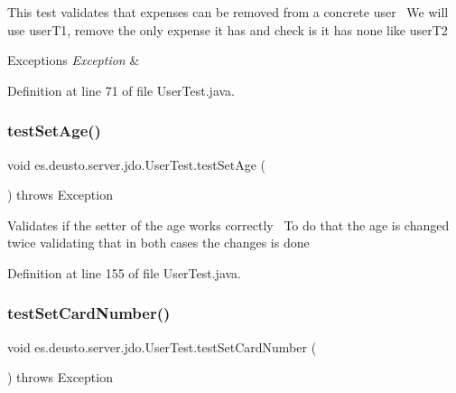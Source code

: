 This test validates that expenses can be removed from a concrete user~\newline
We will use user\+T1, remove the only expense it has and check is it has none like user\+T2 
\begin{DoxyExceptions}{Exceptions}
{\em Exception} & \\
\hline
\end{DoxyExceptions}


Definition at line 71 of file User\+Test.\+java.

\mbox{\label{classes_1_1deusto_1_1server_1_1jdo_1_1_user_test_ac45f9cf087026405559dab8de89f1d66}} 
\subsubsection{\texorpdfstring{test\+Set\+Age()}{testSetAge()}}
{\footnotesize\ttfamily void es.\+deusto.\+server.\+jdo.\+User\+Test.\+test\+Set\+Age (\begin{DoxyParamCaption}{ }\end{DoxyParamCaption}) throws Exception}

Validates if the setter of the age works correctly~\newline
To do that the age is changed twice validating that in both cases the changes is done 

Definition at line 155 of file User\+Test.\+java.

\mbox{\label{classes_1_1deusto_1_1server_1_1jdo_1_1_user_test_a944d9dbc5220860bbc5a8eeaf013d54e}} 
\subsubsection{\texorpdfstring{test\+Set\+Card\+Number()}{testSetCardNumber()}}
{\footnotesize\ttfamily void es.\+deusto.\+server.\+jdo.\+User\+Test.\+test\+Set\+Card\+Number (\begin{DoxyParamCaption}{ }\end{DoxyParamCaption}) throws Exception}

